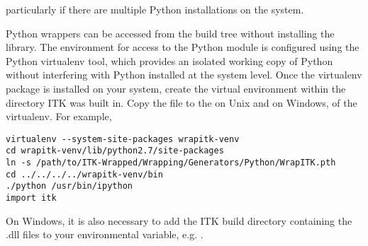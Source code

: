 particularly if there are multiple Python installations on the system.

Python wrappers can be accessed from the build tree without installing the
library. The environment for access to the  Python module is configured
using the Python virtualenv tool, which provides an isolated working copy of
Python without interfering with Python installed at the system level. Once the
virtualenv package is installed on your system, create the virtual environment
within the directory ITK was built in. Copy the  file to
the  on Unix and  on
Windows, of the virtualenv. For example,

\small
\begin{verbatim}
virtualenv --system-site-packages wrapitk-venv
cd wrapitk-venv/lib/python2.7/site-packages
ln -s /path/to/ITK-Wrapped/Wrapping/Generators/Python/WrapITK.pth
cd ../../../../wrapitk-venv/bin
./python /usr/bin/ipython
import itk
\end{verbatim}
\normalsize

On Windows, it is also necessary to add the ITK build directory containing the
.dll files to your  environmental variable, e.g.
.

